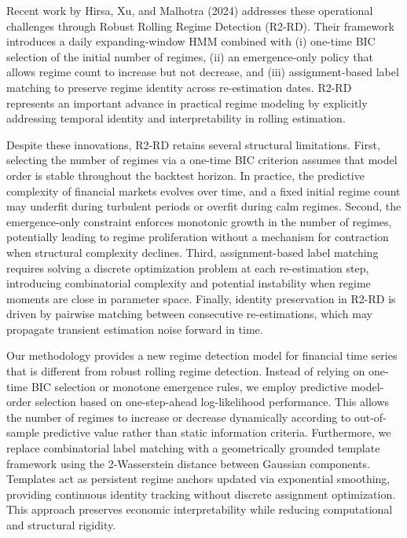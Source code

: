 \documentclass[11pt]{article}
\begin{document}
Recent work by Hirsa, Xu, and Malhotra (2024) addresses these operational challenges through Robust Rolling Regime Detection (R2-RD). Their framework introduces a daily expanding-window HMM combined with (i) one-time BIC selection of the initial number of regimes, (ii) an emergence-only policy that allows regime count to increase but not decrease, and (iii) assignment-based label matching to preserve regime identity across re-estimation dates. R2-RD represents an important advance in practical regime modeling by explicitly addressing temporal identity and interpretability in rolling estimation.

Despite these innovations, R2-RD retains several structural limitations. First, selecting the number of regimes via a one-time BIC criterion assumes that model order is stable throughout the backtest horizon. In practice, the predictive complexity of financial markets evolves over time, and a fixed initial regime count may underfit during turbulent periods or overfit during calm regimes. Second, the emergence-only constraint enforces monotonic growth in the number of regimes, potentially leading to regime proliferation without a mechanism for contraction when structural complexity declines. Third, assignment-based label matching requires solving a discrete optimization problem at each re-estimation step, introducing combinatorial complexity and potential instability when regime moments are close in parameter space. Finally, identity preservation in R2-RD is driven by pairwise matching between consecutive re-estimations, which may propagate transient estimation noise forward in time.

Our methodology provides a new regime detection model for financial time series that is different from robust rolling regime detection. Instead of relying on one-time BIC selection or monotone emergence rules, we employ predictive model-order selection based on one-step-ahead log-likelihood performance. This allows the number of regimes to increase or decrease dynamically according to out-of-sample predictive value rather than static information criteria. Furthermore, we replace combinatorial label matching with a geometrically grounded template framework using the 2-Wasserstein distance between Gaussian components. Templates act as persistent regime anchors updated via exponential smoothing, providing continuous identity tracking without discrete assignment optimization. This approach preserves economic interpretability while reducing computational and structural rigidity.
\end{document}
